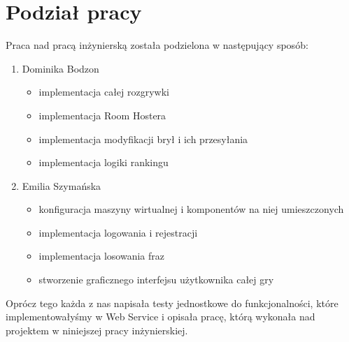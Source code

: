 \section{Podział pracy}
Praca nad pracą inżynierską została podzielona w następujący sposób:
\begin{enumerate}
    \item Dominika Bodzon
    \begin{itemize}
        \item implementacja całej rozgrywki
        \item implementacja Room Hostera
        \item implementacja modyfikacji brył i ich przesyłania
        \item implementacja logiki rankingu
    \end{itemize}
    \item Emilia Szymańska
    \begin{itemize}
        \item konfiguracja maszyny wirtualnej i komponentów na niej umieszczonych
        \item implementacja logowania i rejestracji
        \item implementacja losowania fraz
        \item stworzenie graficznego interfejsu użytkownika całej gry
    \end{itemize}
\end{enumerate}
Oprócz tego każda z nas napisała testy jednostkowe do funkcjonalności, które implementowałyśmy w Web Service i opisała pracę, którą wykonała nad projektem w niniejszej pracy inżynierskiej.